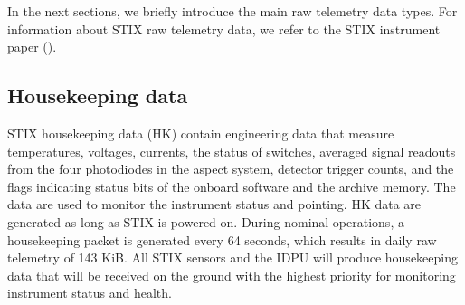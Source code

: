 \documentclass[referee]{aa} %
\begin{document}
In the next sections, we briefly introduce the main raw telemetry data types.
For information about STIX raw telemetry data, we refer to the STIX instrument paper (\cite{StixInstrument}).

\subsection{Housekeeping data}
STIX housekeeping data (HK) contain engineering data that measure temperatures, voltages, currents, the status of switches,
averaged signal readouts from the four photodiodes in the aspect system, detector trigger counts, and the flags indicating
status bits of the onboard software and the archive memory.
The data are used to monitor the instrument status and  pointing.
HK data are generated as long as STIX is powered on.
During nominal operations, a housekeeping packet is generated every 64 seconds, which results in daily raw telemetry of  143 KiB.
All STIX sensors and the IDPU will produce housekeeping data that will be received on the ground with the highest priority
for monitoring instrument status and health.
\end{document}
